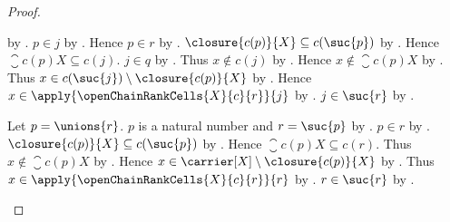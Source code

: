 \begin{proof}
\begin{byCase}
\begin{byCase}
\begin{byCase}
                                by
                                .
                            $p\in j$ by .
                            Hence $p\in r$
                                by
                                .
                            $\closure{c(p)}{X}\subseteq c(\suc{p})$
                                by .
                            Hence $\closure{c(p)}{X}\subseteq c(j)$.
                            $j\in q$ by .
                            Thus $x\notin c(j)$
                                by .
                            Hence $x\notin\closure{c(p)}{X}$
                                by .
                            Thus
                                $x\in c(\suc{j})\setminus
                                    \closure{c(p)}{X}$
                                by .
                            Hence
                                $x\in\apply{
                                    \openChainRankCells{X}{c}{r}}{j}$
                                by
                                .
                            $j\in\suc{r}$ by .
                    \end{byCase}
            \end{byCase}
            Let $p=\unions{r}$.
            $p$ is a natural number and $r=\suc{p}$
                by .
            $p\in r$ by .
            $\closure{c(p)}{X}\subseteq c(\suc{p})$
                by .
            Hence $\closure{c(p)}{X}\subseteq c(r)$.
            Thus $x\notin\closure{c(p)}{X}$ by .
            Hence
                $x\in\carrier[X]\setminus\closure{c(p)}{X}$
                by .
            Thus $x\in\apply{\openChainRankCells{X}{c}{r}}{r}$
                by .
            $r\in\suc{r}$ by .
    \end{byCase}
\end{proof}

